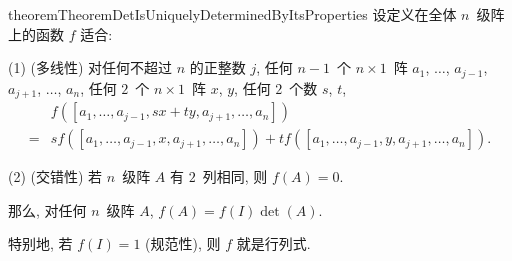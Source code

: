 \documentclass[../libro.tex]{subfiles}
\begin{document}
\begin{restatable}{theorem}{TheoremDetIsUniquelyDeterminedByItsProperties}
    设定义在全体 \(n\)~级阵上的函数 \(f\) 适合:

    (1)
    (多线性)
    对任何不超过 \(n\) 的正整数 \(j\),
    任何 \(n-1\)~个 \(n \times 1\)~阵
    \(a_1\), \(\dots\), \(a_{j-1}\),
    \(a_{j+1}\), \(\dots\), \(a_n\),
    任何 \(2\)~个 \(n \times 1\)~阵 \(x\), \(y\),
    任何 \(2\)~个数 \(s\), \(t\),
    \begin{align*}
        &
        f([a_1, \dots, a_{j-1}, sx + ty, a_{j+1}, \dots, a_n])
        \\
        = {} &
        s f([a_1, \dots, a_{j-1}, x, a_{j+1}, \dots, a_n])
        + t f([a_1, \dots, a_{j-1}, y, a_{j+1}, \dots, a_n]).
    \end{align*}

    (2)
    (交错性)
    若 \(n\)~级阵 \(A\) 有 \(2\)~列相同,
    则 \(f(A) = 0\).

    那么, 对任何 \(n\)~级阵 \(A\),
    \(f(A) = f(I) \det {(A)}\).

    特别地, 若 \(f(I) = 1\) (规范性),
    则 \(f\) 就是行列式.
\end{restatable}
\end{document}
